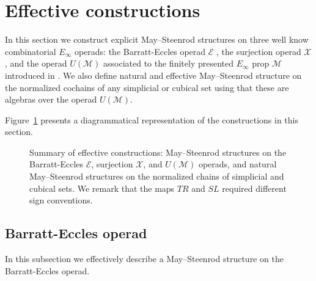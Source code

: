
\section{Effective constructions} \label{s:effective}	

In this section we construct explicit May--Steenrod structures on three well know combinatorial $E_\infty$ operads: the Barratt-Eccles operad $\mathcal E$ \cite{berger04combinatorial}, the surjection operad $\mathcal X$ \cite{mcclure03cochain}, and the operad $U(\mathcal M)$ associated to the finitely presented $E_\infty$ prop $\mathcal M$ introduced in \cite{medina2020prop1}.
We also define natural and effective May--Steenrod structure on the normalized cochains of any simplicial or cubical set using that these are algebras over the operad $U(\mathcal M)$.

Figure~\ref{fig: bigsummary} presents a diagrammatical representation of the constructions in this section.

\begin{figure}
	\caption{Summary of effective constructions: May--Steenrod structures on the Barratt-Eccles $\mathcal E$, surjection $\mathcal X$, and $U(\mathcal M)$ operads, and natural May--Steenrod structures on the normalized chains of simplicial and cubical sets. We remark that the maps $TR$ and $SL$ required different sign conventions.}
	\label{fig: bigsummary}
\end{figure}

\subsection{Barratt-Eccles operad} In this subsection we effectively describe a May--Steenrod structure on the Barratt-Eccles operad.

